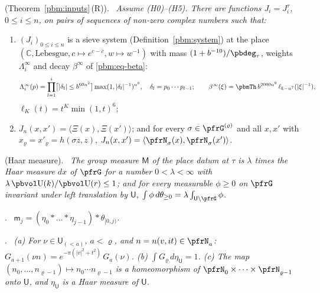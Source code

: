 \documentclass[10pt]{amsart}
\theoremstyle{definition}
\theoremstyle{remark}
\newcommand{\C}{\mathbb C}
\providecommand{\auU}{\mathrm U}
\providecommand{\pfrM}{\mathsf M}
\providecommand{\pfrU}{\mathsf U}
\providecommand{\pfrX}{\Xi}
\providecommand{\pfrell}{\ell}
\providecommand{\pfrip}[2]{\langle#1,#2\rangle}
\providecommand{\pfrm}{\mathsf m}
\newenvironment{quotedthm}[2]{\par\medskip\noindent\begingroup
  \textbf{#1}#2.\ \itshape\ignorespaces}{\endgroup\par\medskip}
\begin{document}
\begin{quotedthm}{\cite[Theorem~2.17]{P52}}{ (Theorem~\ref{pbm:inputs}\,\textup{(R)})}
Assume \textup{(H0)}--\textup{(H5)}. There are functions $J_i=J^\tau_i$, $0\le i\le n$, on pairs of
sequences of non-zero complex numbers such that:
\begin{enumerate}
\item[(R-a)] $(J_i)_{0\le i\le n}$ is a sieve system (Definition~\ref{pbm:system}) at the place
$(\C,\text{Lebesgue},c\mapsto e^{c-\bar c},w\mapsto w^{-1})$ with mass $(1+b^{-10})/\pbdeg_\tau$,
weights $\Lambda^\infty_i$ and decay $\beta^\infty$ of \eqref{pbm:eq-beta}:
\[
\Lambda^\infty_i(p)=\prod_{l=1}^i\bigl[|\delta_l|\le b^{60n^2}\bigr]\max(1,|\delta_l|^{-1})^{n^6},\quad
\delta_l=p_0\cdots p_{l-1};\qquad\beta^\infty(\xi)=\pbmTh\,b^{2000n^9}\,\pfrell_{k-n^7}(|\xi|^{-1}),
\]
$\pfrell_K(t)=t^K\min(1,t)^6$;
\item[(R-b)] $J_n(x,x')=\pfrip{\pfrX(x)}{\pfrX(x')}$; and for every $\sigma\in\pfrG^{(\varrho)}$ and all $x,x'$
with $x_\varrho=x'_\varrho=h(\sigma z,z)$, $J_n(x,x')=\pfrip{\pfrN_\sigma(x)}{\pfrN_\sigma(x')}$.
\end{enumerate}
\end{quotedthm}

\begin{quotedthm}{\cite[Lemma~2.19]{P52}}{ (Haar measure)}
The group measure $\pfrM$ of the place datum at $\tau$ is $\lambda$ times the Haar measure $dx$ of
$\pfrG$ for a number $0<\lambda<\infty$ with $\lambda\,\pbvol\auU(k)/\pbvol\auU(r)\le1$; and for every
measurable $\phi\ge0$ on $\pfrG$ invariant under left translation by $\pfrU$,
$\int\phi\,d\theta_{\ge0}=\lambda\int_{\pfrU\backslash\pfrG}\phi$.
\end{quotedthm}

\begin{quotedthm}{\cite[Lemma~2.41]{P52}}{}
$\pfrm_j=(\eta_0*\dots*\eta_{j-1})*\theta_{[0,j)}$.
\end{quotedthm}

\begin{quotedthm}{\cite[Lemma~4.1]{P52}}{}
\textup{(a)} For $\nu\in\pfrU_{(<a)}$, $a<\varrho$, and $n=n(v,it)\in\pfrN_a$:
$G_{a+1}(\nu n)=e^{-\pi(|v|^2+t^2)}\,G_a(\nu)$.
\textup{(b)} $\int G_\varrho\,d\eta_\pfrU=1$.
\textup{(c)} The map $(n_0,\dots,n_{\varrho-1})\mapsto n_0\cdots n_{\varrho-1}$ is a homeomorphism of
$\pfrN_0\times\dots\times\pfrN_{\varrho-1}$ onto $\pfrU$, and $\eta_\pfrU$ is a Haar measure of $\pfrU$.
\end{quotedthm}
\end{document}

